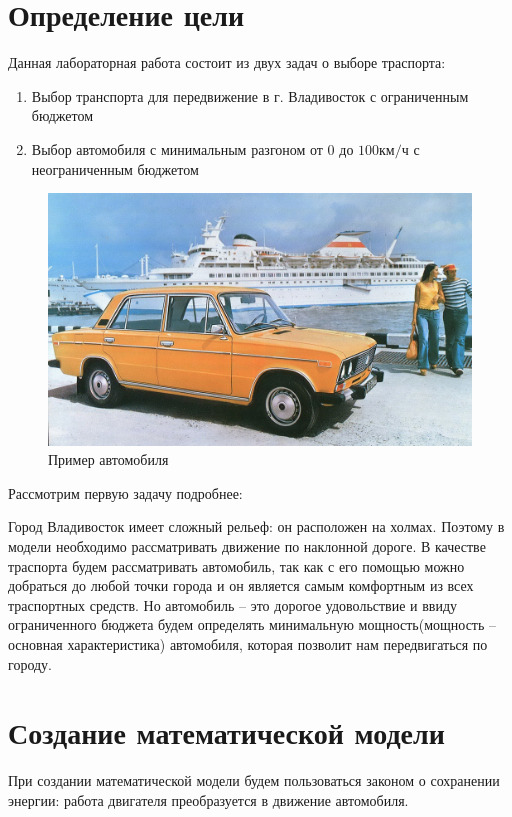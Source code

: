 \documentclass[a4paper, 14pt]{extarticle}
\begin{document}
	\pagebreak	

	\section{Определение цели}
		Данная лабораторная работа состоит из двух задач о выборе траспорта:
		\begin{enumerate}
			\item Выбор транспорта для передвижение в г. Владивосток с ограниченным бюджетом
			\item Выбор автомобиля с минимальным разгоном от 0 до \(100 \text{км}/\text{ч} \) с неограниченным
			бюджетом
		\end{enumerate}
	
		\begin{figure}[H]
			\centering
			\includegraphics[width = \linewidth]{fig1.jpg}
			\caption[.] {Пример автомобиля}
		\end{figure}
		Рассмотрим первую задачу подробнее:
		
			Город Владивосток имеет сложный рельеф: он расположен на холмах. Поэтому в модели необходимо рассматривать движение по наклонной дороге. В качестве траспорта будем рассматривать автомобиль, так как с его помощью можно  добраться до любой точки города и он является самым комфортным из всех траспортных средств. Но автомобиль -- это дорогое удовольствие и ввиду ограниченного бюджета будем определять  минимальную мощность(мощность -- основная характеристика) автомобиля, которая позволит нам передвигаться по городу.

	\section{Создание математической модели}
		При создании математической модели будем пользоваться законом о сохранении энергии: работа двигателя
		преобразуется в движение автомобиля.
\end{document}
